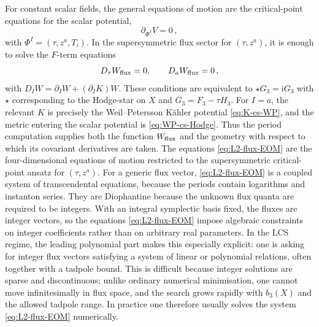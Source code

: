 For constant scalar fields, the general equations of
motion are the critical-point equations for the scalar potential,
\begin{equation}
    \partial_{\Phi^I}V=0\, ,
\end{equation}
with $\Phi^I=(\tau,z^a,T_i)$.  In the supersymmetric flux sector
for $(\tau,z^a)$, it is enough to solve the $F$-term equations
\begin{equation}\label{eq:L2-flux-EOM}
    D_\tau W_{\rm flux}=0,\qquad
    D_a W_{\rm flux}=0\, ,
\end{equation}
with $D_IW=\partial_IW+(\partial_IK)W$.  These conditions are equivalent to $\star G_3=\mathrm{i}G_3$ with $\star$ corresponding to the Hodge-star on $X$ and $G_{3}=F_3-\tau H_3$.
For $I=a$, the relevant
$K$ is precisely the Weil--Petersson K\"ahler potential
\eqref{eq:K-cs-WP}, and the metric entering the scalar potential is
\eqref{eq:WP-cs-Hodge}.  Thus the period computation supplies both
the function $W_{\rm flux}$ and the geometry with respect to which
its covariant derivatives are taken.  The equations
\eqref{eq:L2-flux-EOM} are the four-dimensional equations of motion
restricted to the supersymmetric critical-point ansatz for
$(\tau,z^a)$.  For a generic flux vector,
\eqref{eq:L2-flux-EOM} is a coupled system of transcendental
equations, because the periods contain logarithms and instanton
series.  
They are Diophantine because the unknown flux quanta are required to be integers.
With an integral symplectic basis fixed, the fluxes are integer vectors, so the equations \eqref{eq:L2-flux-EOM} impose algebraic constraints on integer coefficients rather than on arbitrary real parameters. In the LCS regime, the leading polynomial part makes this especially explicit: one is asking for integer flux vectors satisfying a system of linear or polynomial relations, often together with a tadpole bound. This is difficult because integer solutions are sparse and discontinuous; unlike ordinary numerical minimisation, one cannot move infinitesimally in flux space, and the search grows rapidly with $b_3(X)$ and the allowed tadpole range.
In practice one therefore usually solves the system \eqref{eq:L2-flux-EOM} numerically.



